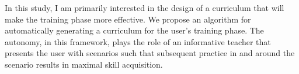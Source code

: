 \documentclass[12pt]{article}
\begin{document}
In this study, I am primarily interested in the design of a curriculum that will make the training phase more effective. We propose an algorithm for automatically generating a curriculum for the user's training phase. The autonomy, in this framework, plays the role of an informative teacher that presents the user with scenarios such that subsequent practice in and around the scenario results in maximal skill acquisition. 
%
%	
%	
%	
%	
\end{document}
